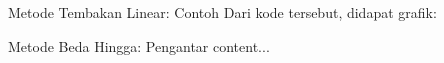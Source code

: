 \documentclass[xcolor={dvipsnames}, 9pt]{beamer}
\renewcommand{\emph}[1]{\textcolor{Blue}{#1}}
\begin{document}
    \begin{frame}{Metode Tembakan Linear: Contoh}
    	Dari kode tersebut, didapat grafik:
    \end{frame}
    \begin{frame}{Metode Beda Hingga: Pengantar}
    	content...
    \end{frame}
\end{document}
